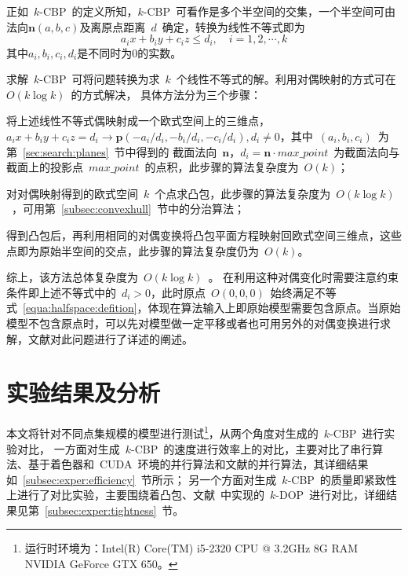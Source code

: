 正如~$k$-CBP~的定义所知，$k$-CBP~可看作是多个半空间的交集，一个半空间可由法向$\bm{n}(a,b,c)$及离原点距离~$d$~确定，转换为线性不等式即为
\begin{equation}
  \label{equa:halfspace:defition}
  a_ix+b_iy+c_iz \leq d_i, \quad i=1,2,\cdots,k
\end{equation}
其中$a_i,b_i,c_i,d_i$是不同时为0的实数。

求解~$k$-CBP~可将问题转换为求~$k$~个线性不等式的解。利用对偶映射的方式可在~$O(k \log k)$~的方式解决，
具体方法分为三个步骤\cite{Preparata1985Introduction}：
\\ \indent
\begin{inparaenum}[(1)]
\item   
将上述线性不等式偶映射成一个欧式空间上的三维点，
$a_ix+b_iy+c_iz=d_i \rightarrow \bm{p}(-a_i/d_i, -b_i/d_i,-c_i/d_i),d_i \neq 0$，其中~$(a_i,b_i,c_i)$~为第~\ref{sec:search:planes}~节中得到的
截面法向~$\bm{n}$，$d_i=\bm{n} \cdot
max\_point$~为截面法向与截面上的投影点~$max\_point$~的点积，此步骤的算法复杂度为~$O(k)$； \\ \indent
\item
  对对偶映射得到的欧式空间~$k$~个点求凸包，此步骤的算法复杂度为~$O(k\log k)$~，可用第~\ref{subsec:convexhull}~节中的分治算法； \\ \indent
\item
  得到凸包后，再利用相同的对偶变换将凸包平面方程映射回欧式空间三维点，这些点即为原始半空间的交点，此步骤的算法复杂度仍为~$O(k)$。
\end{inparaenum}

综上，该方法总体复杂度为~$O(k\log k)$~。
在利用这种对偶变化时需要注意约束条件即上述不等式中的~$d_i>0$，此时原点~$O(0,0,0)$~始终满足不等式~\ref{equa:halfspace:defition}，体现在算法输入上即原始模型需要包含原点。当原始模型不包含原点时，可以先对模型做一定平移或者也可用另外的对偶变换进行求解，文献对此问题进行了详述的阐述。

\section{实验结果及分析}
\label{sec:exper-kcbp}

本文将针对不同点集规模的模型进行测试\footnote{运行时环境为：Intel(R) Core(TM)
i5-2320 CPU @ 3.2GHz 8G RAM NVIDIA GeForce GTX
650。}，从两个角度对生成的~$k$-CBP~进行实验对比，
一方面对生成~$k$-CBP~的速度进行效率上的对比，主要对比了串行算法、基于着色器和~CUDA~环境的并行算法和文献的并行算法，其详细结果如~\ref{subsec:exper:efficiency}~节所示；
另一个方面对生成~$k$-CBP~的质量即紧致性上进行了对比实验，主要围绕着凸包、文献~中实现的~$k$-DOP~进行对比，详细结果见第~\ref{subsec:exper:tightness}~节。


